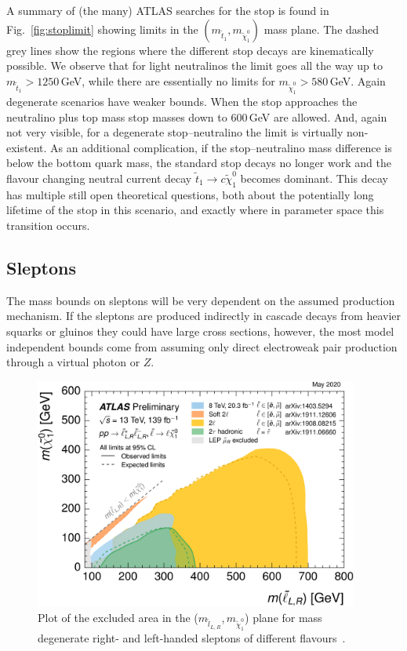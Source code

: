 \documentclass[notes.tex]{subfiles}
\begin{document}
A summary of (the many) ATLAS searches for the stop is found in Fig.~\ref{fig:stoplimit} showing limits in the $(m_{\tilde t_1}, m_{\tilde\chi^0_1})$ mass plane. The dashed grey lines show the regions where the different stop decays are kinematically possible. We observe that for light neutralinos the limit goes all the way up to $m_{\tilde t_1}>1250$\,GeV, while there are essentially no limits for $m_{\tilde\chi^0_1} >580$\,GeV. Again degenerate scenarios 
have weaker bounds. When the stop approaches the neutralino plus top mass stop masses down to 600\,GeV are allowed. And, again not very visible, for a degenerate stop--neutralino the limit is virtually non-existent. As an additional complication, if the stop--neutralino mass difference is below the bottom quark mass, the standard stop decays no longer work and the flavour changing neutral current decay $\tilde{t}_1\to c\tilde{\chi}^0_1$ becomes dominant. This decay has multiple still open theoretical questions, both about the potentially long lifetime of the stop in this scenario, and exactly where in parameter space this transition occurs.


\subsection{Sleptons}
The mass bounds on sleptons will be very dependent on the assumed production mechanism. If the sleptons are produced indirectly in cascade decays from heavier squarks or gluinos they could have large cross sections, however, the most model independent bounds come from assuming only direct electroweak pair production through a virtual photon or $Z$.

\begin{figure}[t!]
\begin{center}
\includegraphics[width=0.95\textwidth]{figures/slepton_limit} 
\caption{Plot of the excluded area in the ($m_{\tilde l_{L,R}}$,\,$m_{\tilde\chi^0_1}$) plane for mass degenerate right- and left-handed  sleptons of different flavours~\cite{ATL-PHYS-PUB-2021-019}.}
\label{fig:sleptonlimit}
\end{center}
\end{figure}
\end{document}

